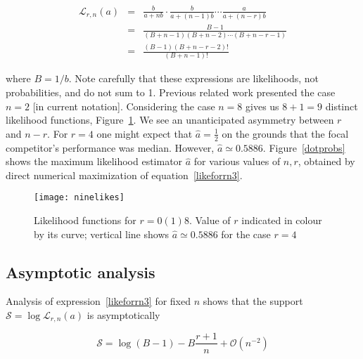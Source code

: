 \documentclass[article]{ajs}
\begin{document}
\begin{eqnarray}\label{likeforrn1}
  \mathcal{L}_{r,n}(a) &=&
\frac{b}{a+ n   b}\cdot
\frac{b}{a+(n-1)b}\cdots\frac{a}{a+(n-r)b}\nonumber\\
&=& \frac{B-1}{(B+n-1)(B+n-2)\cdots(B+n-r-1)}\nonumber\\ 
&=& \frac{(B-1)(B+n-r-2)!}{(B+n-1)!}\label{likeforrn3}
\end{eqnarray}

\noindent where $B=1/b$.  Note carefully that these expressions are
likelihoods, not probabilities, and do not sum to 1.  Previous related
work \citep{hankin2024_hyper3} presented the case $n=2$ [in current
  notation].  Considering the case $n=8$ gives us $8+1=9$ distinct
likelihood functions, Figure~\ref{ninelikes}.  We see an unanticipated
asymmetry between $r$ and $n-r$.  For $r=4$ one might expect that
$\hat{a}=\frac{1}{2}$ on the grounds that the focal competitor's
performance was median.  However, $\hat{a}\simeq 0.5886$.
Figure~\ref{dotprobs} shows the maximum likelihood estimator $\hat{a}$
for various values of $n,r$, obtained by direct numerical maximization
of equation~\ref{likeforrn3}.

\begin{figure}[t]
  \begin{centering}
\texttt{[image: ninelikes]}  %
\caption{Likelihood functions for $r=0(1)8$\label{ninelikes}.  Value
  of $r$ indicated in colour by its curve; vertical line shows
  $\hat{a}\simeq 0.5886$ for the case $r=4$}
\end{centering}
\end{figure}


\subsection{Asymptotic analysis}

Analysis of expression~\ref{likeforrn3} for fixed $n$ shows that the
support $\mathcal{S}=\log\mathcal{L}_{r,n}(a)$ is asymptotically

\begin{equation}\label{asymptotic}
\mathcal{S}=
\log(B-1)-B\frac{r+1}{n}
+\mathcal{O}\left(n^{-2}\right)
\end{equation}
\end{document}
